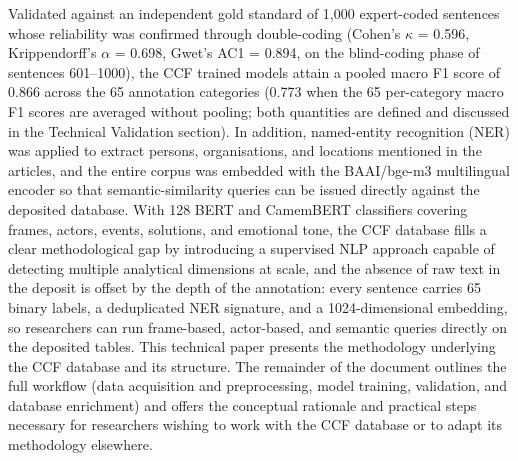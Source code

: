 \documentclass[12pt]{article}
\renewcommand\_{\texttt{\detokenize{_}\allowbreak}}
\begin{document}
Validated against an independent gold standard of 1,000 expert-coded sentences whose reliability was confirmed through double-coding (Cohen's $\kappa$ = 0.596, Krippendorff's $\alpha$ = 0.698, Gwet's AC1 = 0.894, on the blind-coding phase of sentences 601--1000), the CCF trained models attain a pooled macro F1 score of 0.866 across the 65 annotation categories (0.773 when the 65 per-category macro F1 scores are averaged without pooling; both quantities are defined and discussed in the Technical Validation section). In addition, named-entity recognition (NER) was applied to extract persons, organisations, and locations mentioned in the articles, and the entire corpus was embedded with the BAAI/bge-m3 multilingual encoder so that semantic-similarity queries can be issued directly against the deposited database. With 128 BERT and CamemBERT classifiers covering frames, actors, events, solutions, and emotional tone, the CCF database fills a clear methodological gap by introducing a supervised NLP approach capable of detecting multiple analytical dimensions at scale, and the absence of raw text in the deposit is offset by the depth of the annotation: every sentence carries 65 binary labels, a deduplicated NER signature, and a 1024-dimensional embedding, so researchers can run frame-based, actor-based, and semantic queries directly on the deposited tables. This technical paper presents the methodology underlying the CCF database and its structure. The remainder of the document outlines the full workflow (data acquisition and preprocessing, model training, validation, and database enrichment) and offers the conceptual rationale and practical steps necessary for researchers wishing to work with the CCF database or to adapt its methodology elsewhere.
\end{document}
